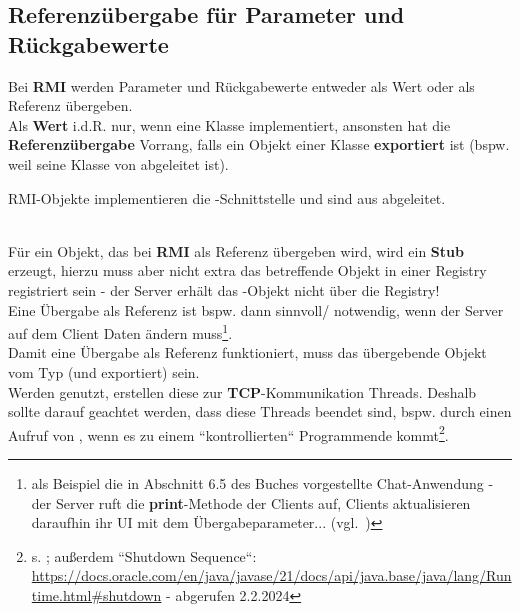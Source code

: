 \subsection{Referenzübergabe für Parameter und Rückgabewerte}\label{sec:refrmi}

Bei \textbf{RMI} werden Parameter und Rückgabewerte entweder als Wert oder als Referenz übergeben.\\

\noindent
Als \textbf{Wert} i.d.R. nur, wenn eine Klasse  implementiert, ansonsten hat die \textbf{Referenzübergabe} Vorrang, falls ein Objekt einer Klasse \textbf{exportiert} ist (bspw. weil seine Klasse von  abgeleitet ist).

\begin{tcolorbox}[enlarge top by=0.5cm,enlarge bottom by=0.5cm]
    RMI-Objekte implementieren die -Schnittstelle und sind aus  abgeleitet.
\end{tcolorbox}\\

\noindent
Für ein Objekt, das bei \textbf{RMI} als Referenz übergeben wird, wird ein \textbf{Stub} erzeugt, hierzu muss aber nicht extra das betreffende Objekt in einer Registry registriert sein - der Server erhält das -Objekt nicht über die Registry!\\

\noindent
Eine Übergabe als Referenz ist bspw. dann sinnvoll/ notwendig, wenn der Server auf dem Client Daten ändern muss\footnote{als Beispiel die in Abschnitt 6.5 des Buches vorgestellte Chat-Anwendung - der Server ruft die \textbf{print}-Methode der Clients auf, Clients aktualisieren daraufhin ihr UI mit dem Übergabeparameter... (vgl.~\cite[Listing 6.22, Listing 6.24]{Oec22})}.\\

\noindent
Damit eine Übergabe als Referenz funktioniert, muss das übergebende Objekt vom Typ  (und exportiert) sein.\\

\noindent
Werden  genutzt, erstellen diese zur \textbf{TCP}-Kommunikation Threads.
Deshalb sollte darauf geachtet werden, dass diese Threads beendet sind, bspw. durch einen Aufruf von , wenn es zu einem ``kontrollierten`` Programmende kommt\footnote{s. \cite[352]{Oec22}; außerdem ``Shutdown Sequence``: \url{https://docs.oracle.com/en/java/javase/21/docs/api/java.base/java/lang/Runtime.html#shutdown} - abgerufen 2.2.2024
}.

